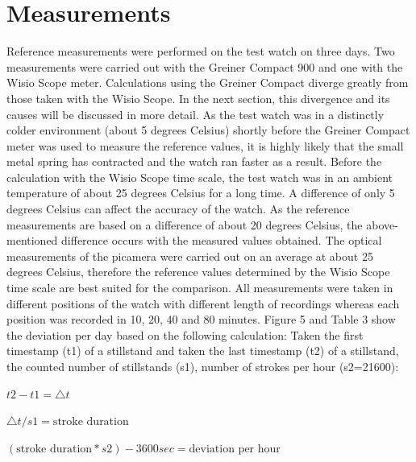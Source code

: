 \documentclass[12pt, a4paper]{report}
\begin{document}
    \section{Measurements}
    Reference measurements were performed on the test watch on three days. Two measurements were carried out with the Greiner Compact 900 and one with the Wisio Scope meter. Calculations using the Greiner Compact diverge greatly from those taken with the Wisio Scope. In the next section, this divergence and its causes will be discussed in more detail. 
\bigskip
\newline
As the test watch was in a distinctly colder environment (about 5 degrees Celsius) shortly before the Greiner Compact meter was used to measure the reference values, it is highly likely that the small metal spring has contracted and the watch ran faster as a result. Before the calculation with the Wisio Scope time scale, the test watch was in an ambient temperature of about 25 degrees Celsius for a long time. A difference of only 5 degrees Celsius can affect the accuracy of the watch. As the reference measurements are based on a difference of about 20 degrees Celsius, the above-mentioned difference occurs with the measured values obtained.
The optical measurements of the picamera were carried out on an average at about 25 degrees Celsius, therefore the reference values determined by the Wisio Scope time scale are best suited for the comparison.
\bigskip
\newline
    All measurements were taken in different positions of the watch with different length
    of recordings whereas each position was recorded in 10, 20, 40 and 80 minutes.
\bigskip
\newline
    Figure 5 and Table 3 show the deviation per day based on the following calculation:
    Taken the first timestamp (t1) of a stillstand and taken the last timestamp (t2) of a stillstand, the counted number of stillstands (s1), number of strokes per hour (s2=21600):
    \bigskip
    
    \begin{center}
    \(t2-t1 = \triangle t\)
        \bigskip
    
	\( \triangle t / s1 = \text{stroke duration}\)
	    \bigskip
    
    \((\text{stroke duration}*s2)-3600 sec=\text{deviation per hour}\)
        
    \end{center}
    
\end{document}
